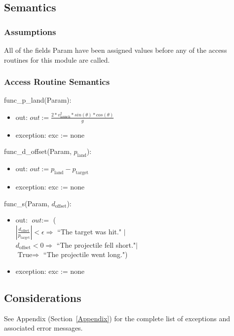 \documentclass[12pt, titlepage]{article}
\begin{document}
\subsection{Semantics}

\subsubsection{Assumptions}

All of the fields Param have been assigned values before any of the access
 routines for this module are called.

\subsubsection{Access Routine Semantics}

func\_p\_land(Param):
 \begin{itemize}
 \item out: $\textit{out} := \frac{2 * v_{\text{launch}}^2 * sin(\theta) * cos(\theta)}{g}$
 \item exception: exc := none
 \end{itemize}
 
func\_d\_offset(Param, $p_{\text{land}}$):
 \begin{itemize}
 \item out: $\textit{out} := p_{\text{land}} - p_{\text{target}}$
 \item exception: exc := none
 \end{itemize}
 
func\_s(Param, $d_{\text{offset}}$):
 \begin{itemize}
 \item out: $\textit{out} := $ ( \\
$|\frac{d_{\text{offset}}}{p_{\text{target}}}| < \epsilon \Rightarrow$ ``The target was hit." $|$\\
$d_{\text{offset}} < 0 \Rightarrow$ ``The projectile fell short."$|$\\
$\text{True} \Rightarrow$ ``The projectile went long.")
 \item exception: exc := none
 \end{itemize}

\subsection{Considerations}

See Appendix (Section~\ref{Appendix}) for the complete list of exceptions and
 associated error messages.
\end{document}
